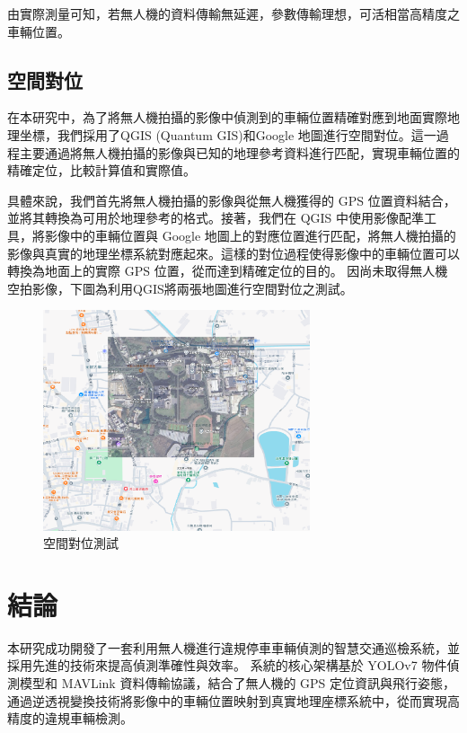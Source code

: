 \documentclass[12pt]{article}       %
\begin{document}
由實際測量可知，若無人機的資料傳輸無延遲，參數傳輸理想，可活相當高精度之車輛位置。

\subsection{空間對位}
\hspace{2em}在本研究中，為了將無人機拍攝的影像中偵測到的車輛位置精確對應到地面實際地理坐標，我們採用了QGIS (Quantum GIS)和Google 地圖進行空間對位。這一過程主要通過將無人機拍攝的影像與已知的地理參考資料進行匹配，實現車輛位置的精確定位，比較計算值和實際值。

具體來說，我們首先將無人機拍攝的影像與從無人機獲得的 GPS 位置資料結合，並將其轉換為可用於地理參考的格式。接著，我們在 QGIS 中使用影像配準工具，將影像中的車輛位置與 Google 地圖上的對應位置進行匹配，將無人機拍攝的影像與真實的地理坐標系統對應起來。這樣的對位過程使得影像中的車輛位置可以轉換為地面上的實際 GPS 位置，從而達到精確定位的目的。
因尚未取得無人機空拍影像，下圖為利用QGIS將兩張地圖進行空間對位之測試。
\begin{figure}[H]
    \centering
    \includegraphics[width=0.7\textwidth]{1234567890.png}     %
    \caption{空間對位測試}    %
    \label{fig:1234567890}    %
\end{figure}

\section{\centering 結論} 
\hspace{2em}本研究成功開發了一套利用無人機進行違規停車車輛偵測的智慧交通巡檢系統，並採用先進的技術來提高偵測準確性與效率。
系統的核心架構基於 YOLOv7 物件偵測模型和 MAVLink 資料傳輸協議，結合了無人機的 GPS 定位資訊與飛行姿態，通過逆透視變換技術將影像中的車輛位置映射到真實地理座標系統中，從而實現高精度的違規車輛檢測。
\end{document}
